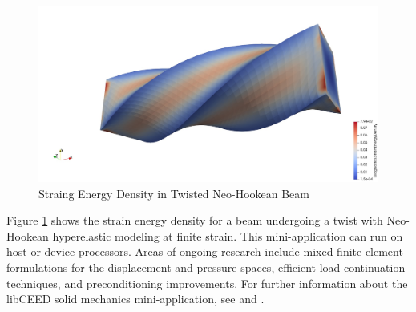 \begin{figure}[ht!]
\includegraphics[width=.99\linewidth]{../img/SolidTwistExample}
\caption{Straing Energy Density in Twisted Neo-Hookean Beam}
\label{fig:solidtwist}
\end{figure}

Figure \ref{fig:solidtwist} shows the strain energy density for a beam undergoing a twist with Neo-Hookean hyperelastic modeling at finite strain.
This mini-application can run on host or device processors.
Areas of ongoing research include mixed finite element formulations for the displacement and pressure spaces, efficient load continuation techniques, and preconditioning improvements.
For further information about the libCEED solid mechanics mini-application, see \cite{imece2020} and \cite{mehraban2021simulating}.
